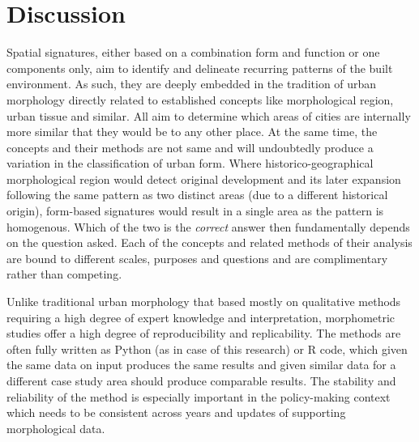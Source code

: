 \section{Discussion}
\label{sec:disc}

Spatial signatures, either based on a combination form and function or one components
only, aim to identify and delineate recurring patterns of the built environment. As
such, they are deeply embedded in the tradition of urban morphology directly related to
established concepts like morphological region, urban tissue and similar. All aim to
determine which areas of cities are internally more similar that they would be to any
other place. At the same time, the concepts and their methods are not same and will
undoubtedly produce a variation in the classification of urban form. Where
historico-geographical morphological region would detect original development and its later
expansion following the same pattern as two distinct areas (due to a different
historical origin), form-based signatures would result in a single area as the pattern
is homogenous. Which of the two is the \textit{correct} answer then fundamentally
depends on the question asked. Each of the concepts and related methods of their
analysis are bound to different scales, purposes and questions and are complimentary
rather than competing.


Unlike traditional urban morphology that based mostly on qualitative methods requiring a
high degree of expert knowledge and interpretation, morphometric studies offer a high
degree of reproducibility and replicability. The methods are often fully written as
Python (as in case of this research) or R code, which given the same data on input
produces the same results and given similar data for a different case study area should
produce comparable results. The stability and reliability of the method is especially
important in the policy-making context which needs to be consistent across years and
updates of supporting morphological data.


